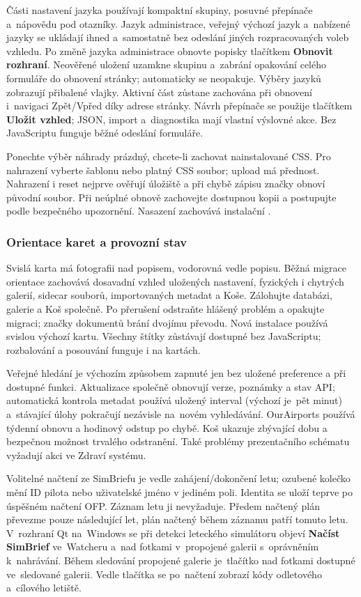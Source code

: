 \documentclass[11pt,a4paper]{article}
\newcommand{\filepath}[1]{\path{#1}}
\newcommand{\ui}[1]{\textbf{#1}}
\begin{document}
Části nastavení jazyka používají kompaktní skupiny, posuvné přepínače a~nápovědu
pod otazníky. Jazyk administrace, veřejný výchozí jazyk a~nabízené jazyky se
ukládají ihned a~samostatně bez odeslání jiných rozpracovaných voleb vzhledu.
Po změně jazyka administrace obnovte popisky tlačítkem \ui{Obnovit rozhraní}.
Neověřené uložení uzamkne skupinu a~zabrání opakování celého formuláře do
obnovení stránky; automaticky se neopakuje. Výběry jazyků zobrazují přibalené
vlajky. Aktivní část zůstane zachována při obnovení i~navigaci Zpět/Vpřed díky
adrese stránky. Návrh přepínače se použije tlačítkem \ui{Uložit vzhled}; JSON,
import a~diagnostika mají vlastní výslovné akce. Bez JavaScriptu funguje běžné
odeslání formuláře.

Ponechte výběr náhrady prázdný, chcete-li zachovat nainstalované CSS. Pro
nahrazení vyberte šablonu nebo platný CSS soubor; upload má přednost. Nahrazení
i reset nejprve ověřují úložiště a při chybě zápisu značky obnoví původní
soubor. Při neúplné obnově zachovejte dostupnou kopii a postupujte podle
bezpečného upozornění. Nasazení zachovává instalační
\filepath{public/assets/custom.css}.

\subsubsection{Orientace karet a provozní stav}
Svislá karta má fotografii nad popisem, vodorovná vedle popisu. Běžná migrace
orientace zachovává dosavadní vzhled uložených nastavení, fyzických i chytrých
galerií, sidecar souborů, importovaných metadat a Koše. Zálohujte databázi,
galerie a Koš společně. Po přerušení odstraňte hlášený problém a opakujte
migraci; značky dokumentů brání dvojímu převodu. Nová instalace používá svislou
výchozí kartu. Všechny štítky zůstávají dostupné bez JavaScriptu; rozbalování a
posouvání funguje i na kartách.

Veřejné hledání je výchozím způsobem zapnuté jen bez uložené preference a při
dostupné funkci. Aktualizace společně obnovují verze, poznámky a stav API;
automatická kontrola metadat používá uložený interval (výchozí je~pět minut)
a~stávající úlohy pokračují nezávisle na~novém vyhledávání. OurAirports používá
týdenní obnovu a hodinový odstup po chybě. Koš ukazuje zbývající dobu a
bezpečnou možnost trvalého odstranění. Také problémy prezentačního schématu
vyžadují akci ve Zdraví systému.

Volitelné načtení ze SimBriefu je vedle zahájení/dokončení letu; ozubené
kolečko mění ID pilota nebo uživatelské jméno v jediném poli. Identita se uloží
teprve po úspěšném načtení OFP. Záznam letu ji nevyžaduje. Předem načtený plán
převezme pouze následující let, plán načtený během záznamu patří tomuto letu.
V~rozhraní Qt na~Windows se při detekci leteckého simulátoru objeví
\ui{Načíst SimBrief} ve~Watcheru a~nad fotkami v~propojené galerii
s~oprávněním k~nahrávání. Během sledování propojené galerie je~tlačítko
nad fotkami dostupné ve~sledované galerii. Vedle tlačítka se po~načtení zobrazí
kódy odletového a~cílového letiště.
\end{document}
